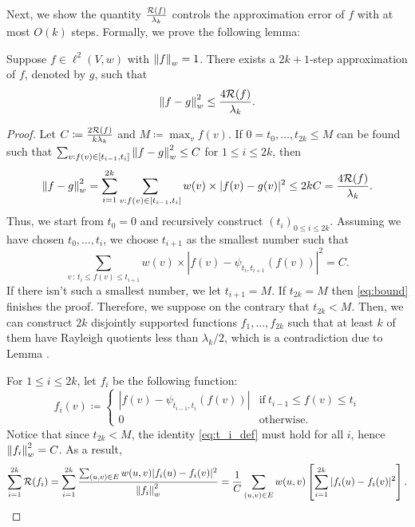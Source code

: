 \documentclass[11pt]{article}
\begin{document}
Next, we show the quantity $\tfrac{\mathcal{R}(f)}{\lambda_k}$ controls the approximation error of $f$ with at most $O(k)$ steps. Formally, we prove the following lemma:
\begin{lemma}\label{lem:approx}
Suppose $f \in \ell^2(V,w)$ with $\left\lVert f \right\rVert_w = 1$. There exists a $2k+1$-step approximation of $f$, denoted by $g$, such that
    \begin{equation}
        \left\lVert f - g \right\rVert_w^2 \leq \frac{4 \mathcal{R}(f)}{\lambda_k}.
    \end{equation}
\end{lemma}

\begin{proof}
Let $C \coloneqq \frac{2 \mathcal{R}(f)}{k \lambda_k}$ and $M \coloneqq \max_v f(v)$. If $0 = t_0, \dots, t_{2k} \leq M$ can be found such that $\sum_{v: f(v) \in [t_{i-1}, t_i]}\left\lVert f-g \right\rVert_w^2 \leq C$ for $1 \leq i \leq 2k$, then
\begin{equation}\label{eq:bound}
    \left\lVert f-g \right\rVert_w^2 = \sum_{i=1}^{2k} \sum_{v: f(v) \in [t_{i-1}, t_i]} w(v) \times |f(v) - g(v)|^2 \leq 2kC = \frac{4\mathcal{R}(f)}{\lambda_k}.
\end{equation}
Thus, we start from $t_0 = 0$ and recursively construct $(t_i)_{0 \leq i \leq 2k}$. Assuming we have chosen $t_0,\dots,t_i$, we choose $t_{i+1}$ as the smallest number such that
\begin{equation} \label{eq:t_i_def}
    \sum_{v \, : \, t_{i} \leq f(v) \leq t_{i+1}} w(v) \times |f(v) - \psi_{t_i, t_{i+1}}(f(v))|^2 = C.
\end{equation}
If there isn't such a smallest number, we let $t_{i+1}=M$. If $t_{2k} = M$ then \eqref{eq:bound} finishes the proof. Therefore, we suppose on the contrary that $t_{2k} < M$. Then, we can construct $2k$ disjointly supported functions $f_1, \dots, f_{2k}$ such that at least $k$ of them have Rayleigh quotients less than $\lambda_k/2$, which is a contradiction due to Lemma .

For $1 \leq i \leq 2k$, let $f_i$ be the following function:
\begin{equation*}
    f_i(v) \coloneqq 
    \begin{cases}
        |f(v) - \psi_{t_{i-1}, t_i}(f(v))| & \text{if} \ t_{i-1} \leq f(v) \leq t_i \\
        0 & \text{otherwise}.
    \end{cases}
\end{equation*}
Notice that since $t_{2k} < M$, the identity \eqref{eq:t_i_def} must hold for all $i$, hence $\left\lVert f_i \right\rVert_w^2 = C$. As a result,
\begin{equation} \label{eq:ub_sum_rayleighs}
    \sum_{i=1}^{2k} \mathcal{R}(f_i) = \sum_{i=1}^{2k} \frac{\sum_{(u, v) \in E} w(u, v)|f_i(u) - f_i(v)|^2}{\left\lVert f_i \right\rVert_w^2} = \frac{1}{C} \sum_{(u, v) \in E} w(u, v) \left[ \sum_{i=1}^{2k} |f_i(u) - f_i(v)|^2 \right].
\end{equation}


\end{proof}
\end{document}
